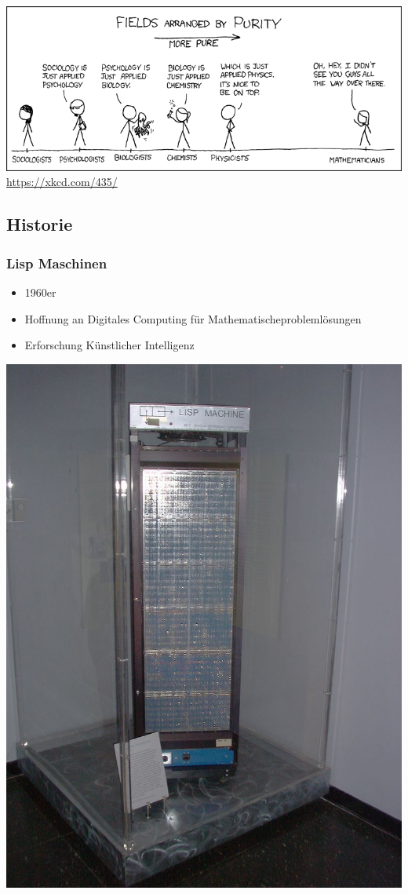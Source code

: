 \documentclass{beamer}
\begin{document}
\begin{frame}
	\centering
	\includegraphics[scale=0.35]{bilder/purity.png}
    \textmd{\url{https://xkcd.com/435/}}
\end{frame}

\begin{frame}
	\section{Historie}
\frametitle{Lisp Maschinen}
	\begin{itemize}
            \item 1960er
            \item Hoffnung an Digitales Computing für Mathematischeproblemlösungen 
            \item Erforschung Künstlicher Intelligenz
	\end{itemize}
	    \includegraphics[scale=0.1]{bilder/lispm.jpg}

\end{frame}
\end{document}
